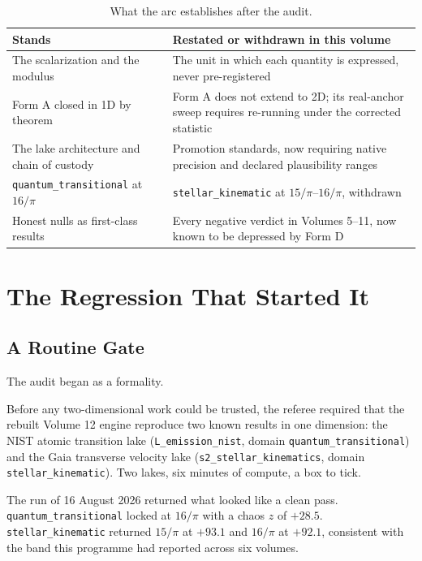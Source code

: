 \documentclass[11pt, letterpaper, openany]{book}
\begin{document}
\begin{table}[H]
\centering
\small
\begin{tabular}{@{}p{}p{}@{}}
\toprule
\textbf{Stands} & \textbf{Restated or withdrawn in this volume} \\
\midrule
The scalarization and the modulus & The unit in which each quantity is expressed, never pre-registered \\
Form A closed in 1D by theorem & Form A does not extend to 2D; its real-anchor sweep requires re-running under the corrected statistic \\
The lake architecture and chain of custody & Promotion standards, now requiring native precision and declared plausibility ranges \\
\texttt{quantum\_transitional} at $16/\pi$ & \texttt{stellar\_kinematic} at $15/\pi$--$16/\pi$, withdrawn \\
Honest nulls as first-class results & Every negative verdict in Volumes 5--11, now known to be depressed by Form D \\
\bottomrule
\end{tabular}
\caption{What the arc establishes after the audit.}
\end{table}

\chapter{The Regression That Started It}

\section{A Routine Gate}

The audit began as a formality.

Before any two-dimensional work could be trusted, the referee required that the rebuilt Volume
12 engine reproduce two known results in one dimension: the NIST atomic transition lake
(\texttt{L\_emission\_nist}, domain \texttt{quantum\_transitional}) and the Gaia transverse
velocity lake (\texttt{s2\_stellar\_kinematics}, domain \texttt{stellar\_kinematic}). Two
lakes, six minutes of compute, a box to tick.

The run of 16 August 2026 returned what looked like a clean pass. \texttt{quantum\_transitional}
locked at $16/\pi$ with a chaos $z$ of $+28.5$. \texttt{stellar\_kinematic} returned
$15/\pi$ at $+93.1$ and $16/\pi$ at $+92.1$, consistent with the band this programme had
reported across six volumes.
\end{document}
